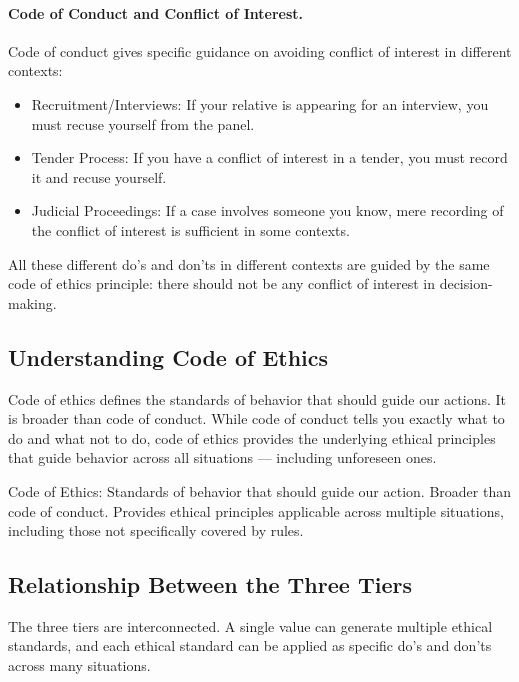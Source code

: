 \paragraph{Code of Conduct and Conflict of Interest.} Code of conduct gives specific guidance on avoiding conflict of interest in different contexts:
\begin{itemize}
\item Recruitment/Interviews: If your relative is appearing for an interview, you must recuse yourself from the panel.
\item Tender Process: If you have a conflict of interest in a tender, you must record it and recuse yourself.
\item Judicial Proceedings: If a case involves someone you know, mere recording of the conflict of interest is sufficient in some contexts.
\end{itemize}
All these different do's and don'ts in different contexts are guided by the same code of ethics principle: there should not be any conflict of interest in decision-making.

\subsection{Understanding Code of Ethics}
Code of ethics defines the standards of behavior that should guide our actions. It is broader than code of conduct. While code of conduct tells you exactly what to do and what not to do, code of ethics provides the underlying ethical principles that guide behavior across all situations --- including unforeseen ones.

\begin{KeyConcept}
Code of Ethics: Standards of behavior that should guide our action. Broader than code of conduct. Provides ethical principles applicable across multiple situations, including those not specifically covered by rules.
\end{KeyConcept}

\subsection{Relationship Between the Three Tiers}
The three tiers are interconnected. A single value can generate multiple ethical standards, and each ethical standard can be applied as specific do's and don'ts across many situations.

